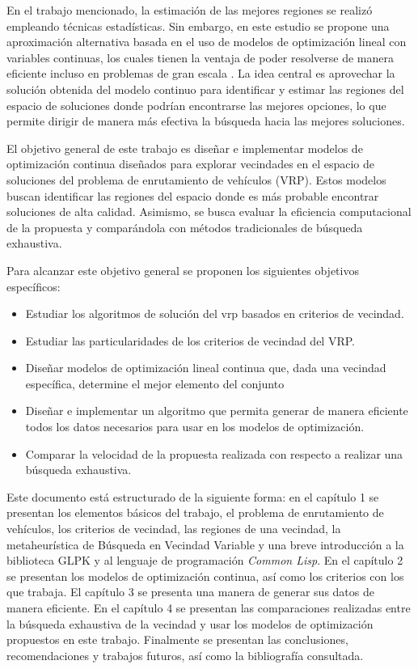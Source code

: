 \documentclass[12pt]{article}
\begin{document}
En el trabajo mencionado, la estimación de las mejores regiones se realizó empleando técnicas estadísticas. Sin embargo, en este estudio se propone una aproximación alternativa basada en el uso de modelos de optimización lineal con variables continuas, los cuales tienen la ventaja de poder resolverse de manera eficiente incluso en problemas de gran escala \cite{ref24}. La idea central es aprovechar la solución obtenida del modelo continuo para identificar y estimar las regiones del espacio de soluciones donde podrían encontrarse las mejores opciones, lo que permite dirigir de manera más efectiva la búsqueda hacia las mejores soluciones.

El objetivo general de este trabajo es diseñar e implementar modelos de optimización continua diseñados para explorar vecindades en el espacio de soluciones del problema de enrutamiento de vehículos (VRP). Estos modelos buscan identificar las regiones del espacio donde es más probable encontrar soluciones de alta calidad. Asimismo, se busca evaluar la eficiencia computacional de la propuesta y comparándola con métodos tradicionales de búsqueda exhaustiva.

Para alcanzar este objetivo general se proponen los siguientes objetivos específicos:
\begin{itemize}
\item
Estudiar los algoritmos de solución del vrp basados en criterios de vecindad.
\item
Estudiar las particularidades de los criterios de vecindad del VRP.

\item 
Diseñar modelos de optimización lineal continua que, dada una vecindad específica, determine el mejor elemento del conjunto

\item 
Diseñar e implementar un algoritmo que permita generar de manera eficiente todos los datos necesarios para usar en los modelos de optimización.

\item Comparar la velocidad de la propuesta realizada con respecto a realizar una búsqueda exhaustiva.
\end{itemize}



Este documento está estructurado de la siguiente forma: en el capítulo 1 se presentan los elementos básicos del trabajo, el problema de enrutamiento de vehículos, los criterios de vecindad, las regiones de una vecindad, la metaheurística de Búsqueda en Vecindad Variable y una breve introducción a la biblioteca GLPK y al lenguaje de programación \textit{Common Lisp}. En el capítulo 2 se presentan los modelos de optimización continua, así como los criterios con los que trabaja. El capítulo 3 se presenta una manera de generar sus datos de manera eficiente. En el capítulo 4 se presentan las comparaciones realizadas entre la búsqueda exhaustiva de la vecindad y usar los modelos de optimización propuestos en este trabajo. Finalmente se presentan las conclusiones, recomendaciones y trabajos futuros, así como la bibliografía consultada.
\newpage

 
\end{document}
